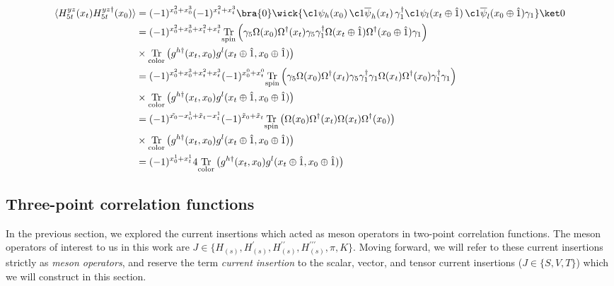 \begin{equation}\label{eq:tensor2ptcorrfunc}
\begin{split}
\langle H^{yz}_{5t}(x_t) H^{yz\dagger}_{5t}(x_0)\rangle &= (-1)^{x^2_0+x^3_0}(-1)^{x^2_t+x^3_t} \bra{0} \wick{ \c1{{\psi}}_h(x_0)\, \c1{\overline{\psi}}_h(x_t)\,
  \gamma_1^\dagger\c1{{\psi}}_l(x_t\oplus \hat1)\,  \c1{\overline{\psi}}_l(x_0\oplus \hat1)\gamma_1} \ket0\\
  &= (-1)^{x^2_0+x^3_0+x^2_t+x^3_t} \underset{\mathrm{spin}}{\mathrm{Tr}}\left( \gamma_5\Omega(x_0)\Omega^\dagger(x_t)\gamma_5 \gamma^\dagger_1\Omega(x_t\oplus \hat1)\Omega^\dagger(x_0\oplus \hat1)\gamma_1
  \right)\\
  &\times \underset{\mathrm{color}}{\mathrm{Tr}}\left( g^{h\dagger}(x_t, x_0)g^l(x_t\oplus \hat1,x_0\oplus \hat1) \right) \\
  &= (-1)^{x^2_0+x^3_0+x^2_t+x^3_t}(-1)^{x^0_0+x^0_t}\underset{\mathrm{spin}}{\mathrm{Tr}}\left( \gamma_5\Omega(x_0)\Omega^\dagger(x_t)\gamma_5 \gamma^\dagger_1
  \gamma_1\Omega(x_t)\Omega^\dagger(x_0)\gamma^\dagger_1\gamma_1 \right)\\
  &\times \underset{\mathrm{color}}{\mathrm{Tr}}\left( g^{h\dagger}(x_t, x_0)g^l(x_t\oplus \hat1,x_0\oplus \hat1) \right) \\
  &= (-1)^{\tilde{x_0}-x^1_0+\tilde{x}_t-x^1_t}(-1)^{\tilde{x}_0+\tilde{x}_t}\underset{\mathrm{spin}}{\mathrm{Tr}}\left(\Omega(x_0)\Omega^\dagger(x_t)\Omega(x_t)\Omega^\dagger(x_0)\right)\\
  &\times \underset{\mathrm{color}}{\mathrm{Tr}}\left( g^{h\dagger}(x_t, x_0)g^l(x_t\oplus \hat1,x_0\oplus \hat1) \right) \\
   &= (-1)^{x^1_0+x^1_t}4\underset{\mathrm{color}}{\mathrm{Tr}}\left( g^{h\dagger}(x_t, x_0)g^l(x_t\oplus \hat1,x_0\oplus \hat1) \right)
\end{split} 
\end{equation}


\subsection{Three-point correlation functions}\label{sec:three-pt-corr-funcs}
In the previous section, we explored the current insertions which acted as meson operators in two-point correlation functions.  The meson operators of interest to us in this work are $J \in \{H_{(s)}, H^{\prime}_{(s)}, H^{\prime\prime}_{(s)}, H^{\prime\prime\prime}_{(s)}, \pi, K\}$.  Moving forward, we will refer to these current insertions strictly as \textit{meson operators}, and reserve the term \textit{current insertion} to the scalar, vector, and tensor current insertions ($J \in \{S,V,T\}$) which we will construct in this section.  

